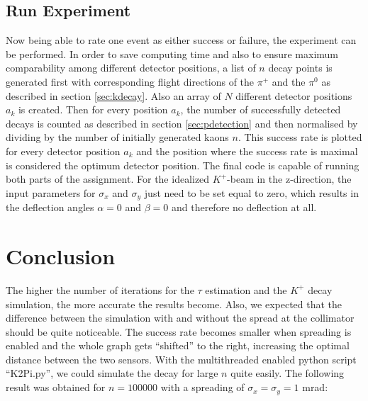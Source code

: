\documentclass[a4paper,parskip,11pt, DIV12]{scrreprt}
\begin{document}
	\clearpage
	
	
	\section{Run Experiment}
	
	Now being able to rate one event as either success or failure, the experiment can be performed. In order to save computing time and also to ensure maximum comparability among different detector positions, a list of $n$ decay points is generated first with corresponding flight directions of the $\pi^+$ and the $\pi^0$ as described in section \ref{sec:kdecay}. Also an array of $N$ different detector positions $a_k$ is created. Then for every position $a_k$, the number of successfully detected decays is counted as described in section \ref{sec:pdetection} and then normalised by dividing by the number of initially generated kaons $n$. This success rate is plotted for every detector position $a_k$ and the position where the success rate is maximal is considered the optimum detector position. The final code is capable of running both parts of the assignment. For the idealized $K^+$-beam in the z-direction, the input parameters for $\sigma_x$ and $\sigma_y$ just need to be set equal to zero,  which results in the deflection angles $\alpha = 0$ and $\beta = 0$ and therefore no deflection at all.
	
	\clearpage
	
	
	\chapter{Conclusion}
	
	The higher the number of iterations for the $\tau$ estimation and the $K^+$ decay simulation, the more accurate the results become. 
	Also, we expected that the difference between the simulation with and without the spread at the collimator should be quite noticeable. The success rate becomes smaller when spreading is enabled and the whole graph gets “shifted” to the right, increasing the optimal distance between the two sensors. 
	With the multithreaded enabled python script “K2Pi.py”, we could simulate the decay for large $n$ quite easily. The following result was obtained for $n = 100000$ with a spreading of $\sigma_x=\sigma_y=1$ mrad:
	
\end{document}
